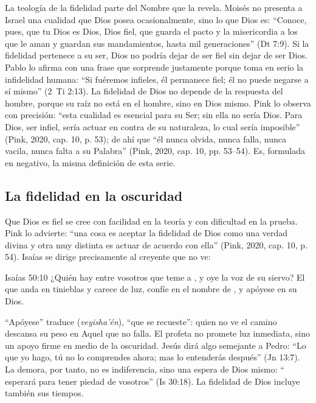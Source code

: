 La teología de la fidelidad parte del Nombre que la revela. Moisés no presenta a Israel una cualidad que Dios posea ocasionalmente, sino lo que Dios es: ``Conoce, pues, que \SENOR{} tu Dios es Dios, Dios fiel, que guarda el pacto y la misericordia a los que le aman y guardan sus mandamientos, hasta mil generaciones'' (Dt 7:9). Si la fidelidad pertenece a su ser, Dios no podría dejar de ser fiel sin dejar de ser Dios. Pablo lo afirma con una frase que sorprende justamente porque toma en serio la infidelidad humana: ``Si fuéremos infieles, él permanece fiel; él no puede negarse a sí mismo'' (2~Ti 2:13). La fidelidad de Dios no depende de la respuesta del hombre, porque su raíz no está en el hombre, sino en Dios mismo. Pink lo observa con precisión: ``esta cualidad es esencial para su Ser; sin ella no sería Dios. Para Dios, ser infiel, sería actuar en contra de su naturaleza, lo cual sería imposible'' (Pink, 2020, cap. 10, p. 53); de ahí que ``él nunca olvida, nunca falla, nunca vacila, nunca falta a su Palabra'' (Pink, 2020, cap. 10, pp. 53--54). Es, formulada en negativo, la misma definición de esta serie.

\subsection{La fidelidad en la oscuridad}
Que Dios es fiel se cree con facilidad en la teoría y con dificultad en la prueba. Pink lo advierte: ``una cosa es aceptar la fidelidad de Dios como una verdad divina y otra muy distinta es actuar de acuerdo con ella'' (Pink, 2020, cap. 10, p. 54). Isaías se dirige precisamente al creyente que no ve:

\begin{verso}{Isaías 50:10}
¿Quién hay entre vosotros que teme a \SENOR, y oye la voz de su siervo? El que anda en tinieblas y carece de luz, confíe en el nombre de \SENOR, y apóyese en su Dios.
\end{verso}

``Apóyese'' traduce  (\emph{veyisha'én}), ``que se recueste'': quien no ve el camino descansa su peso en Aquel que no falla. El profeta no promete luz inmediata, sino un apoyo firme en medio de la oscuridad. Jesús dirá algo semejante a Pedro: ``Lo que yo hago, tú no lo comprendes ahora; mas lo entenderás después'' (Jn 13:7). La demora, por tanto, no es indiferencia, sino una espera de Dios mismo: ``\SENOR{} esperará para tener piedad de vosotros'' (Is 30:18). La fidelidad de Dios incluye también sus tiempos.

